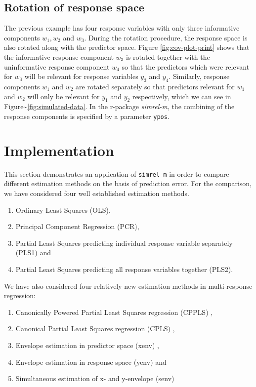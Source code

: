 \documentclass[num-refs]{wiley-article}
\providecommand{\tightlist}{%
  \setlength{\itemsep}{0pt}\setlength{\parskip}{0pt}}
\begin{document}
\hypertarget{rotation-of-response-space}{\subsection{Rotation of
response space}\label{rotation-of-response-space}}

The previous example has four response variables with only three
informative components \(w_1, w_2\) and \(w_3\). During the rotation
procedure, the response space is also rotated along with the predictor
space. Figure \ref{fig:cov-plot-print} shows that the informative
response component \(w_3\) is rotated together with the uninformative
response component \(w_4\) so that the predictors which were relevant
for \(w_3\) will be relevant for response variables \(y_3\) and \(y_4\).
Similarly, response components \(w_1\) and \(w_2\) are rotated
separately so that predictors relevant for \(w_1\) and \(w_2\) will only
be relevant for \(y_1\) and \(y_2\) respectively, which we can see in
Figure\textasciitilde{}\ref{fig:simulated-data}. In the r-package
\emph{simrel-m}, the combining of the response components is specified
by a parameter \texttt{ypos}.

\hypertarget{implementation}{\section{Implementation}\label{implementation}}

This section demonstrates an application of \texttt{simrel-m} in order
to compare different estimation methods on the basis of prediction
error. For the comparison, we have considered four well established
estimation methods.

\begin{enumerate}
\def\labelenumi{\alph{enumi})}
\tightlist
\item
  Ordinary Least Squares (OLS),
\item
  Principal Component Regression (PCR),
\item
  Partial Least Squares predicting individual response variable
  separately (PLS1) and
\item
  Partial Least Squares predicting all response variables together
  (PLS2).
\end{enumerate}

We have also considered four relatively new estimation methods in
multi-response regression:

\begin{enumerate}
\def\labelenumi{\alph{enumi})}
\tightlist
\item
  Canonically Powered Partial Least Squares regression (CPPLS)
  \citep{indahl2009canonical},
\item
  Canonical Partial Least Squares regression (CPLS)
  \citep{indahl2009canonical},
\item
  Envelope estimation in predictor space (xenv)
  \citep{cook2010envelope},
\item
  Envelope estimation in response space (yenv)
  \citep{cook2015foundations} and
\item
  Simultaneous estimation of x- and y-envelope (senv)
  \citep{cook2015simultaneous}
\end{enumerate}
\end{document}
